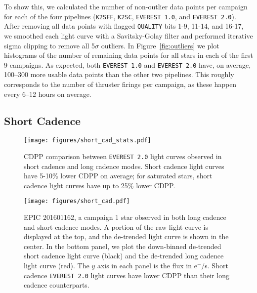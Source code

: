 \documentclass[]{emulateapj}
\begin{document}
To show this, we calculated the number of non-outlier data points per campaign
for each of the four pipelines (\texttt{K2SFF}, \texttt{K2SC}, \texttt{EVEREST 1.0}, and
\texttt{EVEREST 2.0}). After removing all data points with flagged \texttt{QUALITY}
bits 1-9, 11-14, and 16-17, we smoothed each light curve with a Savitsky-Golay filter and
performed iterative sigma clipping to remove all 5$\sigma$ outliers. In Figure~\ref{fig:outliers}
we plot histograms of the number of remaining data points for all stars in each of the first
9 campaigns. As expected, both \texttt{EVEREST 1.0} and \texttt{EVEREST 2.0} have, on
average, 100--300 more usable data points than the other two pipelines. This roughly
corresponds to the number of thruster firings per campaign, as these happen every 6--12
hours on average.

\subsection{Short Cadence}
\label{sec:shortcad}

\begin{figure}[hbt]
  \begin{center}
      \texttt{[image: figures/short\_cad\_stats.pdf]}
       \caption{CDPP comparison between \texttt{EVEREST 2.0} light curves
       observed in short cadence and long cadence modes. Short cadence
       light curves have 5-10\% lower CDPP on average; for saturated stars,
       short cadence light curves have up to 25\% lower CDPP.}
     \label{fig:short_cad_stats}
  \end{center}
\end{figure}

\begin{figure}[hbt]
  \begin{center}
      \texttt{[image: figures/short\_cad.pdf]}
       \caption{EPIC 201601162, a campaign 1 star observed in both long cadence and
       short cadence modes. A portion of the raw light curve is
       displayed at the top, and the de-trended light curve is shown in the center. In the bottom panel,
       we plot the down-binned de-trended short cadence light curve (black) and the
       de-trended long cadence light curve (red). The $y$ axis in each panel is the flux
       in e$^{-}$/s.
       Short cadence \texttt{EVEREST 2.0}
       light curves have lower CDPP than their long cadence counterparts.}
     \label{fig:short_cad}
  \end{center}
\end{figure}
\end{document}
